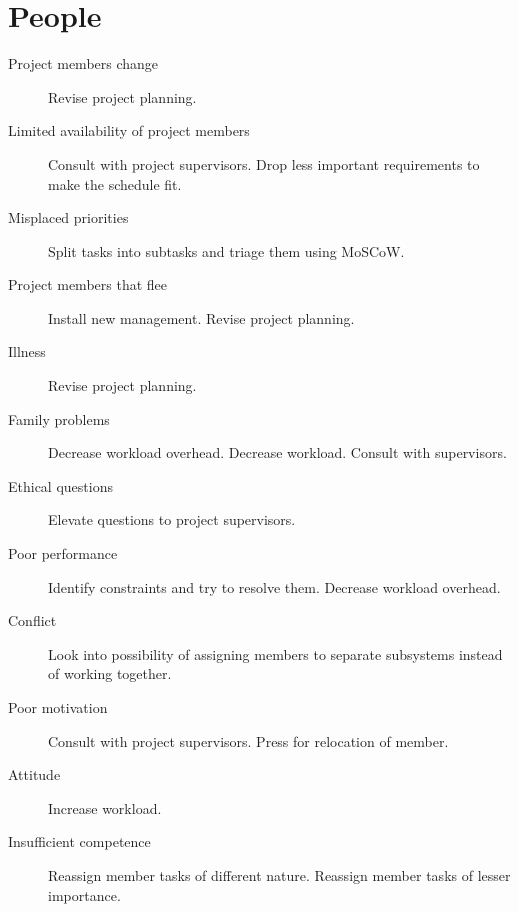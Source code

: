 \section{People}
\begin{description}
\item[Project members change] Revise project planning. \\
\item[Limited availability of project members] Consult with project supervisors. Drop less important requirements to make the schedule fit. \\
\item[Misplaced priorities] Split tasks into subtasks and triage them using MoSCoW.
\item[Project members that flee] Install new management. Revise project planning. \\
\item[Illness] Revise project planning. \\
\item[Family problems] Decrease workload overhead. Decrease workload. Consult with supervisors. \\
\item[Ethical questions] Elevate questions to project supervisors. \\
\item[Poor performance] Identify constraints and try to resolve them. Decrease workload overhead. \\
\item[Conflict] Look into possibility of assigning members to separate subsystems instead of working together. \\
\item[Poor motivation] Consult with project supervisors. Press for relocation of member. \\
\item[Attitude] Increase workload. \\
\item[Insufficient competence] Reassign member tasks of different nature. Reassign member tasks of lesser importance. \\  
\end{description}

